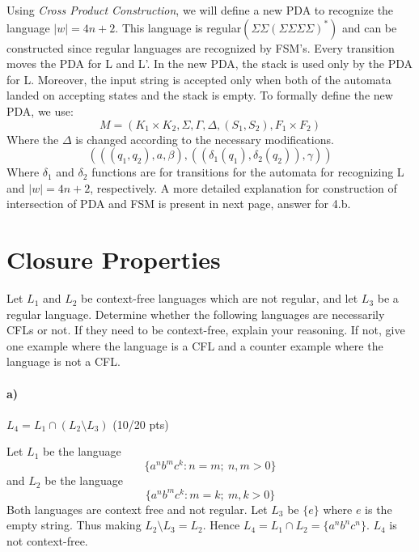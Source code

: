 \documentclass[a4paper,12pt]{article}
\begin{document}
\begin{tcolorbox}
 Using \textit{Cross Product Construction}, we will define a new PDA to recognize the language $|w| = 4n+2$. This language is regular$(\Sigma\Sigma(\Sigma\Sigma\Sigma\Sigma)^*)$ and can be constructed since regular languages are recognized by FSM's. Every transition moves the PDA for L and L'. In the new PDA, the stack is used only by the PDA for L. Moreover, the input string is accepted only when both of the automata landed on accepting states and the stack is empty. To formally define the new PDA, we use:
 \[
 M = (K_1\times K_2, \Sigma, \Gamma, \Delta, (S_1,S_2), F_1\times F_2)
 \]
 Where the $\Delta$ is changed according to the necessary modifications.
 \[
 (((q_1,q_2), a, \beta), ((\delta_1(q_1),\delta_2(q_2)), \gamma))
 \]
 Where $\delta_1$ and $\delta_2$ functions are for transitions for the automata for recognizing L and $|w|=4n+2$, respectively. A more detailed explanation for construction of intersection of PDA and FSM is present in next page, answer for 4.b.
\end{tcolorbox}






\newpage
\section{Closure Properties \hfill {}}

Let $L_1$ and $L_2$ be context-free languages which are not regular, and let $L_3$ be a regular language. Determine whether the following languages are necessarily CFLs or not. If they need to be context-free, explain your reasoning. If not, give one example where the language is a CFL and a counter example where the language is not a CFL. \\

\paragraph{a)} $L_4 = L_1 \cap (L_2 \setminus L_3)$ \hfill \small{(10/20 pts)} \\

\begin{tcolorbox}
Let $L_1$ be the language
\[
\{a^nb^mc^k : n=m;~ n,m>0\}
\]
and $L_2$ be the language
\[
\{a^nb^mc^k : m=k;~m,k>0\}
\]
Both languages are context free and not regular.
Let $L_3$ be $\{e\}$ where $e$ is the empty string. Thus making $L_2\setminus L_3 = L_2$. Hence $L_4 = L_1 \cap L_2 = \{a^nb^nc^n \}$. $L_4$ is not context-free.
\end{tcolorbox}
\end{document}
